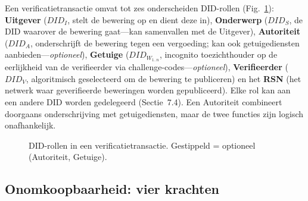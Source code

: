 \documentclass[11pt,a4paper,twocolumn]{article}
\begin{document}
Een verificatietransactie omvat tot zes onderscheiden DID-rollen (Fig.~\ref{fig:roles}): \textbf{Uitgever} ($DID_I$, stelt de bewering op en dient deze in), \textbf{Onderwerp} ($DID_S$, de DID waarover de bewering gaat---kan samenvallen met de Uitgever), \textbf{Autoriteit} ($DID_A$, onderschrijft de bewering tegen een vergoeding; kan ook getuigediensten aanbieden---\emph{optioneel}), \textbf{Getuige} ($DID_{W_{1..n}}$, incognito toezichthouder op de eerlijkheid van de verifieerder via challenge-codes---\emph{optioneel}), \textbf{Verifieerder} ($DID_V$, algoritmisch geselecteerd om de bewering te publiceren) en het \textbf{RSN} (het netwerk waar geverifieerde beweringen worden gepubliceerd). Elke rol kan aan een andere DID worden gedelegeerd (Sectie~7.4). Een Autoriteit combineert doorgaans onderschrijving met getuigediensten, maar de twee functies zijn logisch onafhankelijk.

\begin{figure}[ht]
\centering
{}
\caption{DID-rollen in een verificatietransactie. Gestippeld = optioneel (Autoriteit, Getuige).}
\label{fig:roles}
\end{figure}

\subsection{Onomkoopbaarheid: vier krachten}
\end{document}
